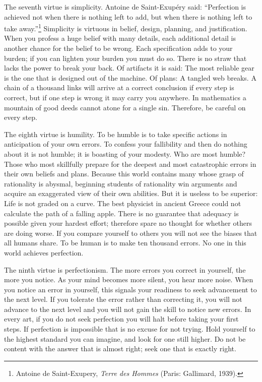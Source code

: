 \label{seventh_virtue}

 The seventh virtue is simplicity. Antoine de Saint-Exupéry said:
``Perfection is achieved not when there is nothing
left to add, but when there is nothing left to take
away.''\footnote{Antoine de Saint-Exupery, \textit{Terre des Hommes} (Paris:
Gallimard, 1939).} Simplicity is virtuous in
belief, design, planning, and justification. When you profess a huge
belief with many details, each additional detail is another chance for
the belief to be wrong. Each specification adds to your burden; if you
can lighten your burden you must do so. There is no straw that lacks
the power to break your back. Of artifacts it is said: The most
reliable gear is the one that is designed out of the machine. Of plans:
A tangled web breaks. A chain of a thousand links will arrive at a
correct conclusion if every step is correct, but if one step is wrong
it may carry you anywhere. In mathematics a mountain of good deeds
cannot atone for a single sin. Therefore, be careful on every step.

\label{eighth_virtue}

 The eighth virtue is humility. To be humble is to take specific
actions in anticipation of your own errors. To confess your fallibility
and then do nothing about it is not humble; it is boasting of your
modesty. Who are most humble? Those who most skillfully prepare for the
deepest and most catastrophic errors in their own beliefs and plans.
Because this world contains many whose grasp of rationality is abysmal,
beginning students of rationality win arguments and acquire an
exaggerated view of their own abilities. But it is useless to be
superior: Life is not graded on a curve. The best physicist in ancient
Greece could not calculate the path of a falling apple. There is no
guarantee that adequacy is possible given your hardest effort;
therefore spare no thought for whether others are doing worse. If you
compare yourself to others you will not see the biases that all humans
share. To be human is to make ten thousand errors. No one in this world
achieves perfection.


 The ninth virtue is perfectionism. The more errors you correct in
yourself, the more you notice. As your mind becomes more silent, you
hear more noise. When you notice an error in yourself, this signals
your readiness to seek advancement to the next level. If you tolerate
the error rather than correcting it, you will not advance to the next
level and you will not gain the skill to notice new errors. In every
art, if you do not seek perfection you will halt before taking your
first steps. If perfection is impossible that is no excuse for not
trying. Hold yourself to the highest standard you can imagine, and look
for one still higher. Do not be content with the answer that is almost
right; seek one that is exactly right.


